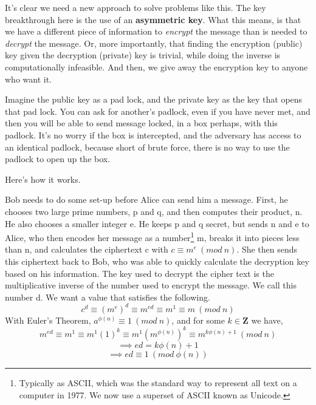 \documentclass{article}
\begin{document}
        It's clear we need a new approach to solve problems like this.  The key breakthrough here is the use of an \textbf{asymmetric key}.  
        What this means, is that we have a different piece of information to \textit{encrypt} the message than is needed to \textit{decrypt} the message.  
        Or, more importantly, that finding the encryption (public) key given the decryption (private) key is trivial, while doing the inverse is computationally infeasible.  
        And then, we give away the encryption key to anyone who want it.
     
        Imagine the public key as a pad lock, and the private key as the key that opens that pad lock.  You can ask for another's padlock, even if you have never met, and then you will be able to send message locked, in a box perhaps, with this padlock.  It's no worry if the box is intercepted, and the adversary has access to an identical padlock, because short of brute force, there is no way to use the padlock to open up the box.
     
        Here's how it works.
        
        Bob needs to do some set-up before Alice can send him a message.  First, he chooses two large prime numbers, p and q, and then computes their product, n.  He also chooses a smaller integer e.  
        He keeps p and q secret, but sends n and e to Alice, who then encodes her message as a 
        number\footnote{Typically as ASCII, which was the standard way to represent all text on a computer in 1977.  We now use a superset of ASCII known as Unicode.} 
        m, breaks it into pieces less than n, and calculates the ciphertext c with $c\equiv m^{e}\ (mod\ n)$.  
        She then sends this ciphertext back to Bob, who was able to quickly calculate the decryption key based on his information.  
        The key used to decrypt the cipher text is the multiplicative inverse of the number used to encrypt the message.  We call this number d.  We want a value that satisfies the following.
        $$c^{d}\equiv (m^{e})^{d}\equiv m^{ed} \equiv m^1 \equiv m\ (mod\ n)$$
        With Euler's Theorem, $a^{\phi(n)} \equiv 1\ (mod\ n)$, and for some $k\in\mathbf{Z}$ we have,
        $$ m^{ed} \equiv m^1 \equiv m^1(1)^k \equiv m^1(m^{\phi(n)})^k \equiv m^{k\phi(n)+1}\ (mod\ n) $$
        $$\implies ed=k\phi(n)+1$$
        $$\implies ed\equiv 1\ (mod\ \phi(n))$$
        
\end{document}
